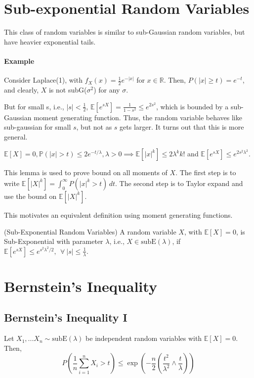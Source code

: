\documentclass[11pt]{article}
\begin{document}
\section{Sub-exponential Random Variables} 
This class of random variables is similar to sub-Gaussian random variables, but have heavier exponential tails. 

\paragraph{Example}
Consider Laplace(1), with $f_X(x)=\frac{1}{2}e^{-|x|}$ for $x \in \mathbb{R}$. Then, $P(|x|\ge t)=e^{-t}$, and clearly, $X$ is not subG($\sigma^2$) for any $\sigma$. 

But for small s, i.e., $|s| < \frac{1}{2}$, $\mathbb{E}[e^{sX}]=\frac{1}{1-s^2} \leq e^{2s^2}$, which is bounded by a sub-Gaussian moment generating function. Thus, the random variable behaves like sub-gaussian for small $s$, but not as $s$ gets larger. It turns out that this is more general.

\begin{lemma} $\mathbb{E}[X]=0, \mathbb{P}(|x|>t)\le 2e^{-t/\lambda}, \lambda>0\implies \mathbb{E}[|x|^k]\le 2 \lambda^k k!$ and $ \mathbb{E}[e^{sX}]\le e^{2s^2\lambda^2}$.
\end{lemma}

This lemma is used to prove bound on all moments of $X$. The
first step is to write $\mathbb{E}[|X|^k]=\int_{0}^\infty P(|x|^k>t)\,dt$. The second step is to Taylor expand and use the bound on $\mathbb{E}[|X|^k]$. 

This motivates an equivalent definition using moment generating functions.



\begin{definition}(Sub-Exponential Random Variables)
A random variable $X$, with $\mathbb{E}[X]=0$, is Sub-Exponential with parameter $\lambda$, i.e., $X \in \text{subE}(\lambda)$,  if $\mathbb{E}[e^{sX}]\le e^{s^2\lambda^2/2},~~\forall ~|s|\le \frac{1}{\lambda}$.
\end{definition}

\section{Bernstein's Inequality}
\subsection{Bernstein's Inequality I}
\begin{theorem}
Let $X_1, ...X_n\sim \text{subE}(\lambda)$ be independent random variables with $\mathbb{E}[X]=0$. Then, 
\[P(\frac{1}{n}\sum_{i=1}^n X_i>t)\le \exp\left(-\frac{n}{2}\left(\frac{t^2}{\lambda^2}\wedge \frac{t}{\lambda}\right)\right)\]
\end{theorem}
\end{document}
